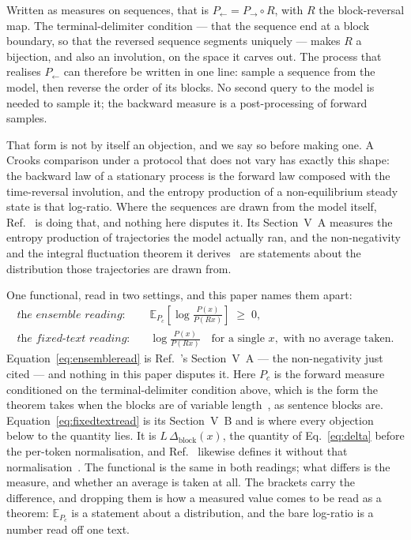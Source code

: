 \documentclass[11pt]{article}
\newcommand{\Dblock}{\Delta_{\mathrm{block}}}
\begin{document}
Written as measures on sequences, that is
$P_\leftarrow = P_\to \circ R$, with $R$ the block-reversal map.  The
terminal-delimiter condition --- that the sequence end at a block boundary,
so that the reversed sequence segments uniquely --- makes $R$ a bijection,
and also an involution, on the space it carves out.  The process that
realises $P_\leftarrow$ can therefore be written in one line: sample a
sequence from the model, then reverse the order of its blocks.  No second query to the model is
needed to sample it; the backward measure is a post-processing of forward samples.

That form is not by itself an objection, and we say so before making one.  A
Crooks comparison under a protocol that does not vary has exactly this shape:
the backward law of a stationary process is the forward law composed with the
time-reversal involution, and the entropy production of a non-equilibrium
steady state is that log-ratio.  Where the sequences are drawn from the model
itself, Ref.~\cite{sagawa2026} is doing that, and nothing here disputes it.
Its Section~V~A measures the entropy production of trajectories the model
actually ran, and the non-negativity and the integral fluctuation theorem it
derives~\cite[Eqs.~(14),~(19) and~(33)]{sagawa2026} are statements about
the distribution those trajectories are drawn from.

One functional, read in two settings, and this paper names them apart:
\begin{align}
\textit{the ensemble reading:}\quad
  &\mathbb{E}_{P_c}\!\left[\log \frac{P(x)}{P(Rx)}\right] \;\ge\; 0 ,
  \label{eq:ensembleread}\\[2pt]
\textit{the fixed-text reading:}\quad
  &\log \frac{P(x)}{P(Rx)} \quad \text{for a single } x ,
   \text{ with no average taken.}
  \label{eq:fixedtextread}
\end{align}
Equation~\eqref{eq:ensembleread} is Ref.~\cite{sagawa2026}'s Section~V~A
--- the non-negativity just cited --- and nothing in this paper disputes
it.  Here $P_c$ is the forward measure conditioned on the terminal-delimiter
condition above, which is the form the theorem takes when the blocks are of
variable length~\cite[Eq.~(34)]{sagawa2026}, as sentence blocks are.
Equation~\eqref{eq:fixedtextread} is its Section~V~B and is where every
objection below to the quantity lies.  It is $L\,\Dblock(x)$, the quantity
of Eq.~\eqref{eq:delta} before the per-token normalisation, and
Ref.~\cite{sagawa2026} likewise defines it without that
normalisation~\cite[Eq.~(32)]{sagawa2026}.  The functional is the same in both
readings; what differs is the measure, and whether an average is taken at
all.  The brackets carry the difference, and dropping them is how a
measured value comes to be read as a theorem: $\mathbb{E}_{P_c}$ is a
statement about a distribution, and the bare log-ratio is a number read off
one text.
\end{document}

